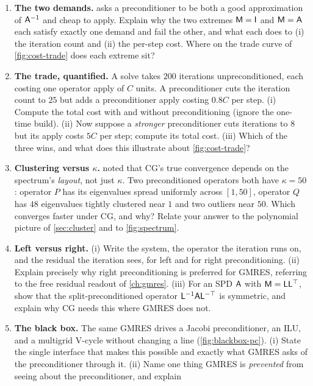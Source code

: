 \exercisessection
\begin{enumerate}[nosep]
  \item \textbf{The two demands.}  asks a preconditioner to be both a good
  approximation of $\mathsf{A}^{-1}$ and cheap to apply. Explain why the two extremes
  $\mathsf{M}=\mathsf{I}$ and $\mathsf{M}=\mathsf{A}$ each satisfy exactly one demand and fail the other,
  and what each does to (i) the iteration count and (ii) the per-step cost. Where on the trade
  curve of \cref{fig:cost-trade} does each extreme sit?
  \item \textbf{The trade, quantified.} A solve takes $200$ iterations unpreconditioned, each
  costing one operator apply of $C$ units. A preconditioner cuts the iteration count to $25$ but
  adds a preconditioner apply costing $0.8C$ per step. (i) Compute the total cost with and
  without preconditioning (ignore the one-time build). (ii) Now suppose a \emph{stronger}
  preconditioner cuts iterations to $8$ but its apply costs $5C$ per step; compute its total
  cost. (iii) Which of the three wins, and what does this illustrate about \cref{fig:cost-trade}?
  \item \textbf{Clustering versus $\kappa$.}  noted that CG's true convergence depends
  on the spectrum's \emph{layout}, not just $\kappa$. Two preconditioned operators both have
  $\kappa=50$: operator $P$ has its eigenvalues spread uniformly across $[1,50]$, operator $Q$ has
  $48$ eigenvalues tightly clustered near $1$ and two outliers near $50$. Which converges faster
  under CG, and why? Relate your answer to the polynomial picture of \cref{sec:cluster} and to
  \cref{fig:spectrum}.
  \item \textbf{Left versus right.} (i) Write the system, the operator the iteration runs on, and
  the residual the iteration sees, for left and for right preconditioning. (ii) Explain precisely
  why right preconditioning is preferred for GMRES, referring to the free residual readout of
  \cref{ch:gmres}. (iii) For an SPD $\mathsf{A}$ with $\mathsf{M}=\mathsf{L}\mathsf{L}^{\top}$, show that the
  split-preconditioned operator $\mathsf{L}^{-1}\mathsf{A}\mathsf{L}^{-\top}$ is symmetric, and explain why
  CG needs this where GMRES does not.
  \item \textbf{The black box.} The same GMRES drives a Jacobi preconditioner, an ILU, and a
  multigrid V-cycle without changing a line (\cref{fig:blackbox-pc}). (i) State the single
  interface that makes this possible and exactly what GMRES asks of the preconditioner through it.
  (ii) Name one thing GMRES is \emph{prevented} from seeing about the preconditioner, and explain

\end{enumerate}
